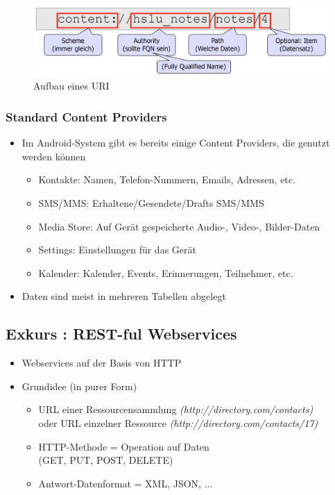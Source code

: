 \documentclass[a4paper]{article}
\begin{document}
\begin{figure}[htb!]
	\centering
	\includegraphics[width=.8\textwidth]{img/content_uri.png}
	\caption{Aufbau eines URI}
	\label{fig:uri_content}
\end{figure}
	
\subsubsection{Standard Content Providers}

\begin{itemize}
	\item Im Android-System gibt es bereits einige Content Providers, die genutzt werden können
		\begin{itemize}
			\item Kontakte: Namen, Telefon-Nummern, Emails, Adressen, etc.
			\item SMS/MMS: Erhaltene/Gesendete/Drafts SMS/MMS
			\item Media Store: Auf Gerät gespeicherte Audio-, Video-, Bilder-Daten
			\item Settings: Einstellungen für das Gerät
			\item Kalender: Kalender, Events, Erinnerungen, Teilnehmer, etc. 
		\end{itemize}
	\item Daten sind meist in mehreren Tabellen abgelegt
\end{itemize}	

\subsection{Exkurs : REST-ful Webservices}

\begin{itemize}
	\item Webservices auf der Basis von HTTP
	\item Grundidee (in purer Form)
		\begin{itemize}
			\item URL einer Ressourcensammlung \textit{(http://directory.com/contacts)}\\
			oder URL einzelner Ressource \textit{(http://directory.com/contacts/17)}
			\item HTTP-Methode = Operation auf Daten\\
			(GET, PUT, POST, DELETE)
			\item Antwort-Datenformat = XML, JSON, ...
		\end{itemize}
\end{itemize}
\end{document}
